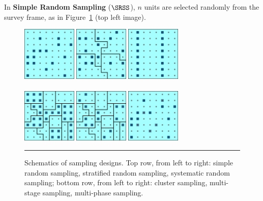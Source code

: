 In \textbf{Simple Random Sampling} ($\SRSS$), $n$ units are selected randomly from the survey frame, as in Figure~\ref{fig:designs} (top left image). \begin{figure}[t]
\centering
\includegraphics[width=0.23\textwidth]{Images/Sampling_SRS.png}\qquad
\includegraphics[width=0.23\textwidth]{Images/Sampling_StS.png}\qquad
\includegraphics[width=0.23\textwidth]{Images/Sampling_SyS.png}
\\ \ \\
\includegraphics[width=0.23\textwidth]{Images/Sampling_ClS.png}\qquad
\includegraphics[width=0.23\textwidth]{Images/Sampling_MSS.png}\qquad
\includegraphics[width=0.23\textwidth]{Images/Sampling_MPS.png}
\caption[\small Schematics of sampling designs]{\small Schematics of sampling designs. Top row, from left to right: simple random sampling, stratified random sampling, systematic random sampling; bottom row, from left to right: cluster sampling, multi-stage sampling, multi-phase sampling.}
\hrule\label{fig:designs}
\end{figure}
